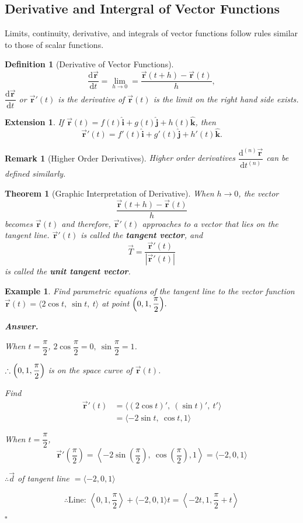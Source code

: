 \documentclass[12pt,a4paper]{article}
\newtheorem{thm}{Theorem}[subsection]
\newtheorem{df}{Definition}[subsection]
\newtheorem{eg}{Example}[subsection]
\newenvironment*{ans}{\par\indent\textbf{\textit{Answer. }}\par}{\par\hfill{$\square$}\par}
\newtheorem*{rmk}{\indent Remark}
\newtheorem*{ext}{\indent Extension}
\def\d{{\mathrm{d}}}
\def\vecd{\vec{d}}
\def\vecr{\vec{\boldsymbol{\textbf{r}}}}
\def\veci{\hat{\boldsymbol{\textbf{i}}}}
\def\vecj{\hat{\boldsymbol{\textbf{j}}}}
\def\veck{\hat{\boldsymbol{\textbf{k}}}}
\begin{document}
\subsection{Derivative and Intergral of Vector Functions}
Limits, continuity, derivative, and integrals of vector functions follow rules similar to those of scalar functions.
\begin{df}[Derivative of Vector Functions]
	\[\frac{\d\vecr}{\d t}=\lim_{h\to0}=\frac{\vecr(t+h)-\vecr(t)}{h},\] $\dfrac{\d\vecr}{\d t}$ or $\vecr'(t)$ is the derivative of $\vecr(t)$ is the limit on the right hand side exists. 
\end{df}
\begin{ext}
	If $\vecr(t)=f(t)\veci+g(t)\vecj+h(t)\veck$, then\[\vecr'(t)=f'(t)\veci+g'(t)\vecj+h'(t)\veck.\]	
\end{ext}
\begin{rmk}[Higher Order Derivatives]
	Higher order derivatives $\dfrac{\d^{(n)}\vecr}{\d t^{(n)}}$ can be defined similarly. 	
\end{rmk}
\begin{thm}[Graphic Interpretation of Derivative]
	When $h\to0$, the vector \[\dfrac{\vecr(t+h)-\vecr(t)}{h}\] becomes $\vecr(t)$ and therefore, $\vecr'(t)$ approaches to a vector that lies on the tangent line. $\vecr'(t)$ is called the \textbf{tangent vector}, and \[\vec{T}=\dfrac{\vecr'(t)}{|\vecr'(t)|}\] is called the \textbf{unit tangent vector}.
\end{thm}
\begin{eg}
	Find parametric equations of the tangent line to the vector function $\vecr(t)=\langle2\cos{t},\ \sin{t},\ t\rangle$ at point $\qty(0,1,\dfrac{\pi}{2}).$
	\begin{ans}
		When $t=\dfrac{\pi}{2}$, $2\cos{\dfrac{\pi}{2}}=0,\ \sin{\dfrac{\pi}{2}}=1$.\par $\therefore\qty(0,1,\dfrac{\pi}{2})$ is on the space curve of $\vecr(t)$.\par Find \[\begin{aligned}\vecr'(t)&=\langle(2\cos{t})',\ (\sin{t})',\ t'\rangle\\&=\langle-2\sin{t},\ \cos{t}, 1\rangle\end{aligned}\]	\par When $t=\dfrac{\pi}{2}$, \[\vecr'\left(\frac{\pi}{2}\right)=\left\langle-2\sin{\left(\frac{\pi}{2}\right)},\ \cos{\left(\frac{\pi}{2}\right)}, 1\right\rangle=\langle-2,0,1\rangle\]\par $\therefore \vecd$ of tangent line $=\langle-2,0,1\rangle$\par \[\therefore\text{Line: }\left\langle0,1,\frac{\pi}{2}\right\rangle+\langle-2,0,1\rangle t=\left\langle-2t,1,\frac{\pi}{2}+t\right\rangle\]
	\end{ans}	
\end{eg}
\end{document}
